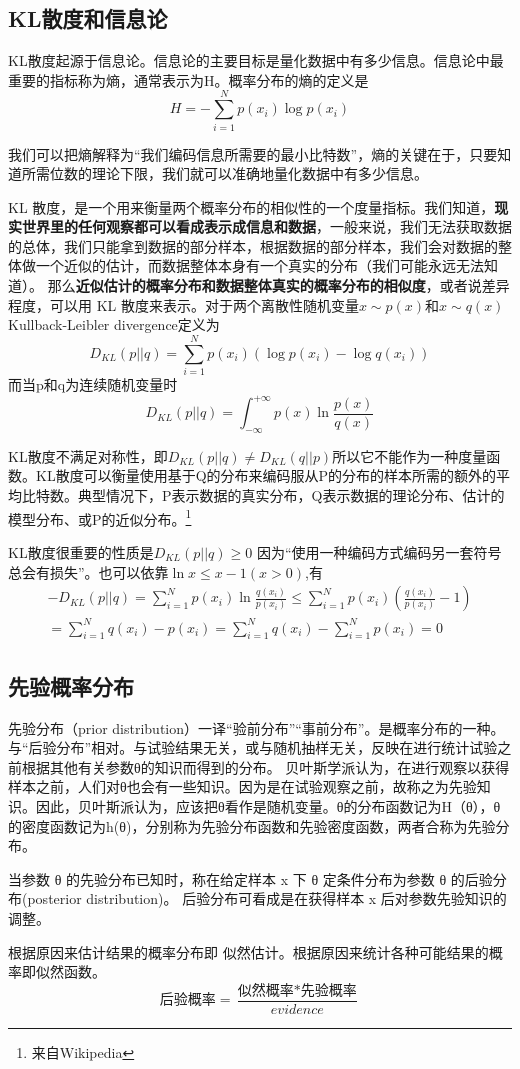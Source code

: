 \documentclass[12pt, a4paper, oneside]{ctexart}
\begin{document}
\subsection{KL散度和信息论}
\par
KL散度起源于信息论。信息论的主要目标是量化数据中有多少信息。信息论中最重要的指标称为熵，通常表示为H。概率分布的熵的定义是$$H=-\sum_{i=1}^{N}{p(x_i)\log p(x_i)}$$
\par
我们可以把熵解释为“我们编码信息所需要的最小比特数”，熵的关键在于，只要知道所需位数的理论下限，我们就可以准确地量化数据中有多少信息。
\par
KL 散度，是一个用来衡量两个概率分布的相似性的一个度量指标。我们知道，\textbf{现实世界里的任何观察都可以看成表示成信息和数据}，一般来说，我们无法获取数据的总体，我们只能拿到数据的部分样本，根据数据的部分样本，我们会对数据的整体做一个近似的估计，而数据整体本身有一个真实的分布（我们可能永远无法知道）。
那么\textbf{近似估计的概率分布和数据整体真实的概率分布的相似度}，或者说差异程度，可以用 KL 散度来表示。对于两个离散性随机变量$x\sim p(x)$和$x\sim q(x)$Kullback-Leibler divergence定义为$$D_{KL}(p||q)=\sum_{i=1}^{N}{p(x_i)(\log p(x_i)-\log q(x_i))}$$ 
而当p和q为连续随机变量时$$D_{KL}(p||q)=\int_{-\infty}^{+\infty}{p(x)\ln \frac{p(x)}{q(x)}}$$
\par
KL散度不满足对称性，即$D_{KL}(p||q)\neq D_{KL}(q||p)$所以它不能作为一种度量函数。KL散度可以衡量使用基于Q的分布来编码服从P的分布的样本所需的额外的平均比特数。典型情况下，P表示数据的真实分布，Q表示数据的理论分布、估计的模型分布、或P的近似分布。\footnote{来自Wikipedia}
\par
KL散度很重要的性质是$D_{KL}(p||q)\geq 0$ 因为“使用一种编码方式编码另一套符号总会有损失”。也可以依靠$\ln x \leq x-1(x>0) $,有 
\begin{equation}
    \begin{aligned}
        -D_{KL}(p||q)=\sum_{i=1}^{N}{p(x_i)\ln \frac{q(x_i)}{p(x_i)}}\leq \sum_{i=1}^{N}{p(x_i)(\frac{q(x_i)}{p(x_i)}-1) }\\ =\sum_{i=1}^{N}{q(x_i)-p(x_i)}=\sum_{i=1}^{N}{q(x_i)}-\sum_{i=1}^{N}{p(x_i)}=0
    \end{aligned}
    \nonumber
\end{equation}

\subsection{先验概率分布}
\par 
先验分布（prior distribution）一译“验前分布”“事前分布”。是概率分布的一种。与“后验分布”相对。与试验结果无关，或与随机抽样无关，反映在进行统计试验之前根据其他有关参数θ的知识而得到的分布。
贝叶斯学派认为，在进行观察以获得样本之前，人们对θ也会有一些知识。因为是在试验观察之前，故称之为先验知识。因此，贝叶斯派认为，应该把θ看作是随机变量。θ的分布函数记为H（θ），θ的密度函数记为h(θ)，分别称为先验分布函数和先验密度函数，两者合称为先验分布。
\par
当参数 θ 的先验分布已知时，称在给定样本 x 下 θ 定条件分布为参数 θ 的后验分布(posterior distribution)。
后验分布可看成是在获得样本 x 后对参数先验知识的调整。
\par
根据原因来估计结果的概率分布即 似然估计。根据原因来统计各种可能结果的概率即似然函数。$${\mbox{后验概率}}=\frac{\mbox{似然概率}*\mbox{先验概率}}{evidence}$$
\end{document}
